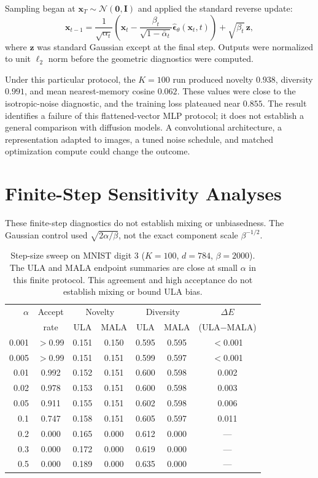 Sampling began at $\mathbf x_T\sim\mathcal N(\mathbf0,\mathbf I)$ and applied
the standard reverse update:
\begin{equation}
\mathbf x_{t-1}=\frac{1}{\sqrt{\alpha_t}}
\left(\mathbf x_t-
\frac{\beta_t}{\sqrt{1-\bar\alpha_t}}
\widehat{\boldsymbol\epsilon}_{\theta}(\mathbf x_t,t)\right)
+\sqrt{\beta_t}\,\mathbf z,
\end{equation}
where $\mathbf z$ was standard Gaussian except at the final step. Outputs were
normalized to unit $\ell_2$ norm before the geometric diagnostics were
computed.

Under this particular protocol, the $K=100$ run produced novelty $0.938$,
diversity $0.991$, and mean nearest-memory cosine $0.062$. These values were
close to the isotropic-noise diagnostic, and the training loss plateaued near
$0.855$. The result identifies a failure of this flattened-vector MLP protocol;
it does not establish a general comparison with diffusion models. A
convolutional architecture, a representation adapted to images, a tuned noise
schedule, and matched optimization compute could change the outcome.


\section{Finite-Step Sensitivity Analyses}
These finite-step diagnostics do not establish mixing or unbiasedness. The
Gaussian control used $\sqrt{2\alpha/\beta}$, not the exact component scale
$\beta^{-1/2}$.
\begin{table}[ht]
\centering
\caption{Step-size sweep on MNIST digit 3 ($K=100$, $d=784$,
$\beta=2000$). The ULA and MALA endpoint summaries are close at small $\alpha$ in
this finite protocol. This agreement and high acceptance do not establish
mixing or bound ULA bias.}
\label{tab:stepsize-sweep}
\small
\begin{tabular}{@{}rcccccc@{}}
\toprule
$\alpha$ & Accept & \multicolumn{2}{c}{Novelty} & \multicolumn{2}{c}{Diversity} & $\Delta E$ \\
 & rate & ULA & MALA & ULA & MALA & (ULA$-$MALA) \\
\midrule
0.001 & $>$0.99 & 0.151 & 0.150 & 0.595 & 0.595 & $<$0.001 \\
0.005 & $>$0.99 & 0.151 & 0.151 & 0.599 & 0.597 & $<$0.001 \\
0.01  & 0.992 & 0.152 & 0.151 & 0.600 & 0.598 & 0.002 \\
0.02  & 0.978 & 0.153 & 0.151 & 0.600 & 0.598 & 0.003 \\
0.05  & 0.911 & 0.155 & 0.151 & 0.602 & 0.598 & 0.006 \\
0.1   & 0.747 & 0.158 & 0.151 & 0.605 & 0.597 & 0.011 \\
0.2   & 0.000 & 0.165 & 0.000 & 0.612 & 0.000 & --- \\
0.3   & 0.000 & 0.172 & 0.000 & 0.619 & 0.000 & --- \\
0.5   & 0.000 & 0.189 & 0.000 & 0.635 & 0.000 & --- \\
\bottomrule
\end{tabular}
\end{table}

